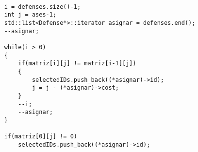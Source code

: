 \begin{lstlisting}

    i = defenses.size()-1;
    int j = ases-1;
    std::list<Defense*>::iterator asignar = defenses.end();
    --asignar;

    while(i > 0)
    {
    	if(matriz[i][j] != matriz[i-1][j])
    	{
	    	selectedIDs.push_back((*asignar)->id);
	    	j = j - (*asignar)->cost;
    	}	
    	--i;
	    --asignar;	
    }

    if(matriz[0][j] != 0)
    	selectedIDs.push_back((*asignar)->id);

\end{lstlisting}
